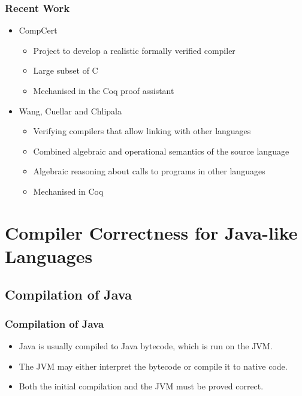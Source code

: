 \documentclass{beamer}
\newcommand{\footmake}[1]{
\ifthenelse{\equal{#1}{}}%
	{}%
	{\footnotetext{#1}}%
}
\newenvironment{slide}[2][fragile,environment=slide]
{\begin{frame}[#1]
	\frametitle{#2}\begin{refsegment}}
{\footmake{\printbibliography[segment=\therefsegment]}\end{refsegment}\end{frame}}
\begin{document}
\begin{slide}{Recent Work}
  \begin{itemize}
  \item CompCert\cite{leroy2012}
    \begin{itemize}
    \item Project to develop a realistic formally verified compiler
    \item Large subset of C
    \item Mechanised in the Coq proof assistant\cite{coq2004}
    \end{itemize}
  \item Wang, Cuellar and Chlipala\cite{wang2014}
    \begin{itemize}
    \item Verifying compilers that allow linking with other languages
    \item Combined algebraic and operational semantics of the source language
    \item Algebraic reasoning about calls to programs in other languages
    \item Mechanised in Coq 
    \end{itemize}
  \end{itemize}
\end{slide}

\section{Compiler Correctness for Java-like Languages}

\frame{\sectionpage}

\subsection{Compilation of Java}

\begin{frame}
  \frametitle{Compilation of Java}
  \begin{itemize}
  \item Java is usually compiled to Java bytecode, which is run on the JVM.
  \item The JVM may either interpret the bytecode or compile it to native code.
  \item Both the initial compilation and the JVM must be proved correct.
  \end{itemize}
  \begin{center}
  \end{center}
\end{frame}
\end{document}
